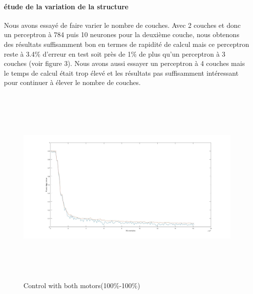 \documentclass[a4paper,oneside]{report}
\begin{document}
\newpage
\paragraph{étude de la variation de la structure}
Nous avons essayé de faire varier le nombre de couches. Avec 2 couches et donc un perceptron à 784 puis 10 neurones pour la deuxième couche, nous obtenons des résultats suffisamment bon en termes de rapidité de calcul mais ce perceptron reste à 3.4\% d'erreur en test soit près de 1\% de plus qu'un perceptron à 3 couches (voir figure 3). Nous avons aussi essayer un perceptron à 4 couches mais le temps de calcul était trop élevé et les résultats pas suffisamment intéressant pour continuer à élever le nombre de couches. 

\begin{figure}[!h]
	\begin{center}
		\includegraphics[width=17cm,height=10cm]{Images/courbes2couches.jpg} 
		\caption{Control with both motors(100$\%$-100$\%$)} 
	\end{center}
\end{figure}
\end{document}
